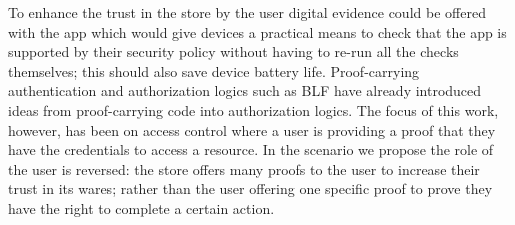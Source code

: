\documentclass[report.tex]{subfiles}
\begin{document}
To enhance the trust in the store by the user digital evidence could be offered
with the app which would give devices a practical means to check that the app is
supported by their security policy without having to re-run all the checks
themselves; this should also save device battery life.  Proof-carrying
authentication\cite{Appel:1999dq} and authorization logics such as
BLF\cite{Whitehead:2004bu} have already introduced ideas from proof-carrying
code into authorization logics. The focus of this work, however, has been on
access control where a user is providing a proof that they have the credentials
to access a resource.   In the scenario we propose the role of the user is
reversed: the store offers many proofs to the user to increase their trust in
its wares; rather than the user offering one specific proof to prove they have
the right to complete a certain action.
\end{document}
